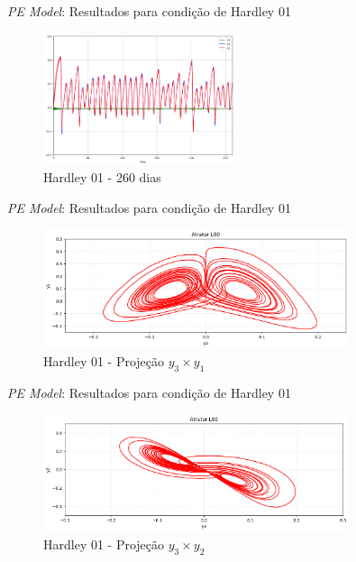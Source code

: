 
\begin{frame}{\textit{PE Model}: Resultados para condição de Hardley 01}
   \begin{figure}
       \centering
       \includegraphics[width=0.5\textwidth]{img/p02d260.png}
       \caption{Hardley 01 - 260 dias}
       \label{fig:p02}
   \end{figure}
\end{frame}



\begin{frame}{\textit{PE Model}: Resultados para condição de Hardley 01}
   \begin{figure}
       \centering
           \includegraphics[width=0.8\textwidth]{img/p02y3y1.png}
       \caption{Hardley 01 - Projeção $y_3 \times y_1$}
       \label{fig:p02y3y1}
   \end{figure}
\end{frame}


\begin{frame}{\textit{PE Model}: Resultados para condição de Hardley 01}
   \begin{figure}
       \centering
       \includegraphics[width=0.8\textwidth]{img/p02y3y2.png}
       \caption{Hardley 01 - Projeção $y_3 \times y_2$}
       \label{fig:p02y3y2}
   \end{figure}
\end{frame}

